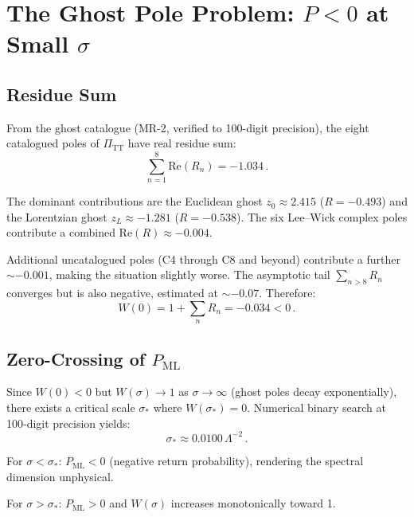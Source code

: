 \documentclass[11pt,a4paper]{article}
\newcommand{\PiTT}{\Pi_{\mathrm{TT}}}
\begin{document}
\section{The Ghost Pole Problem: $P < 0$ at Small $\sigma$}
\label{sec:ghost}

\subsection{Residue Sum}

From the ghost catalogue (MR-2, verified to 100-digit precision),
the eight catalogued poles of $\PiTT$ have real residue sum:
\begin{equation}\label{eq:sum-R}
  \sum_{n=1}^{8} \mathrm{Re}(R_n) = -1.034\,.
\end{equation}

The dominant contributions are the Euclidean ghost
$z_0 \approx 2.415$ ($R = -0.493$) and the Lorentzian ghost
$z_L \approx -1.281$ ($R = -0.538$). The six Lee--Wick complex
poles contribute a combined $\mathrm{Re}(R) \approx -0.004$.

Additional uncatalogued poles (C4 through C8 and beyond) contribute
a further $\sim -0.001$, making the situation slightly worse.
The asymptotic tail $\sum_{n > 8} R_n$ converges but is also negative,
estimated at $\sim -0.07$. Therefore:
\begin{equation}\label{eq:W0}
  W(0) = 1 + \sum_n R_n = -0.034 < 0\,.
\end{equation}

\subsection{Zero-Crossing of $P_{\mathrm{ML}}$}

Since $W(0) < 0$ but $W(\sigma) \to 1$ as $\sigma \to \infty$
(ghost poles decay exponentially), there exists a critical scale
$\sigma_*$ where $W(\sigma_*) = 0$. Numerical binary search at
100-digit precision yields:
\begin{equation}\label{eq:sigma-star}
  \boxed{\sigma_* \approx 0.0100\,\Lambda^{-2}\,.}
\end{equation}

For $\sigma < \sigma_*$: $P_{\mathrm{ML}} < 0$ (negative return probability),
rendering the spectral dimension unphysical.

For $\sigma > \sigma_*$: $P_{\mathrm{ML}} > 0$ and $W(\sigma)$
increases monotonically toward 1.
\end{document}

